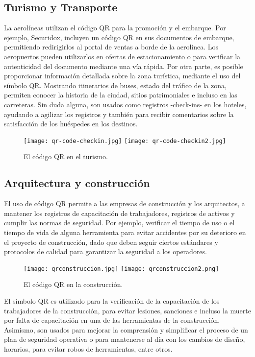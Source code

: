 \subsection{Turismo y Transporte}

La aerolíneas utilizan el código QR para la promoción y el embarque. Por ejemplo, Securidox, incluyen un código QR en sus documentos de embarque, permitiendo redirigirlos al portal de ventas a borde de la aerolínea. Los aeropuertos pueden utilizarlos en ofertas de estacionamiento o para verificar la autenticidad del documento mediante una vía rápida. Por otra parte, es posible proporcionar información detallada sobre la zona turística, mediante el uso del símbolo QR. Mostrando itinerarios de buses, estado del tráfico de la zona, permiten conocer la historia de la ciudad, sitios patrimoniales e incluso en las carreteras. Sin duda alguna, son usados como registros -check-ins- en los hoteles, ayudando a agilizar los registros y también para recibir comentarios sobre la satisfacción de los huéspedes en los destinos.\cite{2012_Emek,2021_Vuksanovic}
\begin{figure} 
	\centering 
	\texttt{[image: qr-code-checkin.jpg]}
	\texttt{[image: qr-code-checkin2.jpg]}
	\caption{El código QR en el turismo.}
	\label{fig:qrturismo}
\end{figure}

\subsection{Arquitectura y construcción}

El uso de código QR permite a las empresas de construcción y los arquitectos, a mantener los registros de capacitación de trabajadores, registros de activos y cumplir las normas de seguridad. Por ejemplo, verificar el tiempo de uso o el tiempo de vida de alguna herramienta para evitar accidentes por su deterioro en el proyecto de construcción, dado que deben seguir ciertos estándares y protocolos de calidad para garantizar la seguridad a los operadores. 
\begin{figure} 	
	\centering
	\texttt{[image: qrconstruccion.jpg]}
	\texttt{[image: qrconstruccion2.png]}
	\caption{El código QR en la construcción.}
	\label{fig:qrconstruccion}
\end{figure}

El símbolo QR es utilizado para la verificación de la capacitación de los trabajadores de la construcción, para evitar lesiones, sanciones e incluso la muerte por falta de capacitación en una de las herramientas de la construcción.  Asimismo, son usados para mejorar la comprensión y simplificar el proceso de un plan de seguridad operativa o para mantenerse al día con los cambios de diseño, horarios, para evitar robos de herramientas, entre otros. \cite{delivr2021}

